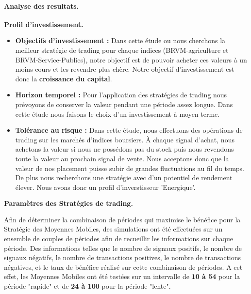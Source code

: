 \paragraph{Analyse des resultats.}\label{analyse-des-resultats.}

\textbf{Profil d'investissement.}

\begin{itemize}
\item
  \textbf{Objectifs d'investissement :} Dans cette étude ou nous
  cherchons la meilleur stratégie de trading pour chaque indices
  (BRVM-agriculture et BRVM-Service-Publics), notre objectif est de
  pouvoir acheter ces valeurs à un moins cours et les revendre plus
  chère. Notre objectif d'investissement est donc la \textbf{croissance
  du capital}.
\item
  \textbf{Horizon temporel :} Pour l'application des stratégies de
  trading nous prévoyons de conserver la valeur pendant une période
  assez longue. Dans cette étude nous faisons le choix d'un
  investissement à moyen terme.
\item
  \textbf{Tolérance au risque :} Dans cette étude, nous effectuons des
  opérations de trading sur les marchés d'indices boursiers. À chaque
  signal d'achat, nous achetons la valeur si nous ne possédons pas du
  stock puis nous revendons toute la valeur au prochain signal de vente.
  Nous acceptons donc que la valeur de nos placement puisse subir de
  grandes fluctuations au fil du temps. De plus nous recherchons une
  stratégie avec d'un potentiel de rendement élever. Nous avons donc un
  profil d'inverstisseur 'Energique'.
\end{itemize}

\textbf{Paramètres des Stratégies de trading.}

Afin de déterminer la combinaison de périodes qui maximise le bénéfice
pour la Stratégie des Moyennes Mobiles, des simulations ont été
effectuées sur un ensemble de couples de périodes afin de recueillir les
informations sur chaque période. Des informations telles que le nombre
de signaux positifs, le nombre de signaux négatifs, le nombre de
transactions positives, le nombre de transactions négatives, et le taux
de bénéfice réalisé sur cette combinaison de périodes. A cet effet, les
Moyennes Mobiles ont été testées sur un intervalle de \textbf{10 à 54}
pour la période "rapide" et de \textbf{24 à 100} pour la période
"lente".

